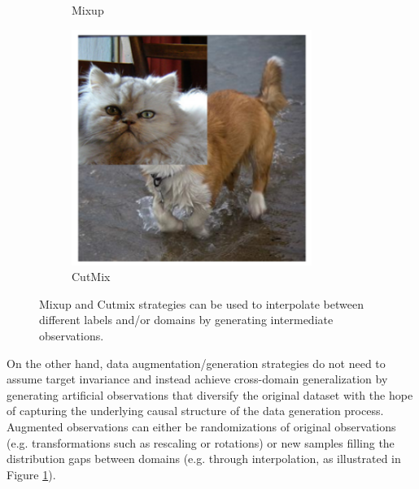 \begin{figure}[H]
\begin{subfigure}[b]{0.2\textwidth}
        \caption{Mixup 
        \cite{zhangMixupEmpiricalRisk2018}
        }
    \end{subfigure}
    \hspace{1cm}
    \begin{subfigure}[b]{0.2\textwidth}
        \centering
        \includegraphics[width=\textwidth]{img/introduction/da_cutmix.png}
        \caption{CutMix
        \cite{yunCutMixRegularizationStrategy2019}
        }
    \end{subfigure}
       \caption{
        Mixup and Cutmix strategies can be used to interpolate
        between different labels and/or domains
        by generating intermediate observations.
        \cite{yunCutMixRegularizationStrategy2019}
        }
       \label{fig:data_augmentation}
\end{figure}

On the other hand, data augmentation/generation strategies 
do not need to assume target invariance and instead 
achieve cross-domain generalization by generating artificial observations that
diversify the original dataset with the hope of capturing 
the underlying causal structure of the data generation process. Augmented observations
can either be randomizations of original observations (e.g. transformations
such as rescaling or rotations) or new samples filling the distribution
gaps between domains (e.g. through interpolation, as illustrated 
in Figure \ref{fig:data_augmentation}). \\

